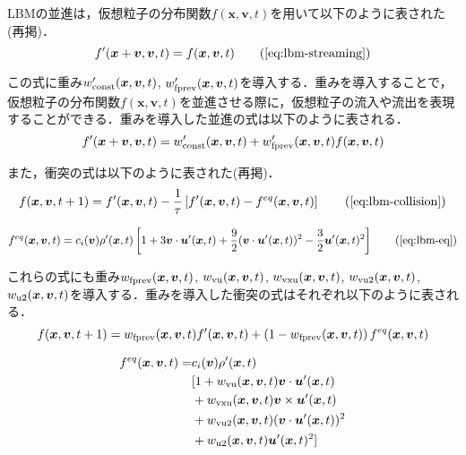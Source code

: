 LBMの並進は，仮想粒子の分布関数$f(\bm{x}, \bm{v}, t)$を用いて以下のように表された(再掲)．
\begin{equation}
  f'(\bm{x}+\bm{v}, \bm{v}, t)
  = f(\bm{x}, \bm{v}, t)
  \tag{\ref{eq:lbm-streaming}}
\end{equation}

この式に重み$w'_{\rm{const}}(\bm{x}, \bm{v}, t)$, $w'_{\rm{fprev}}(\bm{x}, \bm{v}, t)$を導入する．重みを導入することで，仮想粒子の分布関数$f(\bm{x}, \bm{v}, t)$を並進させる際に，仮想粒子の流入や流出を表現することができる．重みを導入した並進の式は以下のように表される．
\begin{equation}
  f'(\bm{x}+\bm{v}, \bm{v}, t) = 
  w'_{\rm{const}}(\bm{x}, \bm{v}, t) + 
  w'_{\rm{fprev}}(\bm{x}, \bm{v}, t) f(\bm{x}, \bm{v}, t)
  \label{eq:weighted-streaming}
\end{equation}

また，衝突の式は以下のように表された(再掲)．
\begin{equation}
  f(\bm{x}, \bm{v}, t+1) = 
  f'(\bm{x}, \bm{v}, t) - 
  \frac{1}{\tau} \left[ 
    f'(\bm{x}, \bm{v}, t) - f^{eq}(\bm{x}, \bm{v}, t) 
  \right]
  \tag{\ref{eq:lbm-collision}}
\end{equation}

\begin{equation}
  f^{eq}(\bm{x}, \bm{v}, t) = 
  c_i(\bm{v}) \rho'(\bm{x}, t) \left[ 
    1 
    + 3\bm{v} \cdot \bm{u}'(\bm{x}, t) 
    + \frac{9}{2}(\bm{v} \cdot \bm{u}'(\bm{x}, t))^2 
    - \frac{3}{2}\bm{u}'(\bm{x}, t)^2 
  \right]
  \tag{\ref{eq:lbm-eq}}
\end{equation}

これらの式にも重み$w_{\rm{fprev}}(\bm{x}, \bm{v}, t)$, $w_{\rm{vu}}(\bm{x}, \bm{v}, t)$, $w_{\rm{vxu}}(\bm{x}, \bm{v}, t)$, $w_{\rm{vu2}}(\bm{x}, \bm{v}, t)$, $w_{\rm{u2}}(\bm{x}, \bm{v}, t)$を導入する．重みを導入した衝突の式はそれぞれ以下のように表される．
\begin{equation}
  f(\bm{x}, \bm{v}, t+1) = 
  w_{\rm{fprev}}(\bm{x}, \bm{v}, t) f'(\bm{x}, \bm{v}, t) 
  + \left(1 - w_{\rm{fprev}}(\bm{x}, \bm{v}, t)\right) f^{eq}(\bm{x}, \bm{v}, t)
  \label{eq:weighted-collision}
\end{equation}

\begin{equation}
\begin{split}
  f^{eq}(\bm{x}, \bm{v}, t) =
  &c_i(\bm{v}) \rho'(\bm{x}, t) \\
  &[ 1 + w_{\rm{vu}}(\bm{x}, \bm{v}, t)\bm{v} \cdot \bm{u}'(\bm{x}, t) \\
  &+ w_{\rm{vxu}}(\bm{x}, \bm{v}, t)\bm{v} \times \bm{u}'(\bm{x}, t) \\
  &+ w_{\rm{vu2}}(\bm{x}, \bm{v}, t)(\bm{v} \cdot \bm{u}'(\bm{x}, t))^2 \\
  &+ w_{\rm{u2}}(\bm{x}, \bm{v}, t)\bm{u}'(\bm{x}, t)^2 ]
\end{split}
  \label{eq:weighted-equilibrium}
\end{equation}


